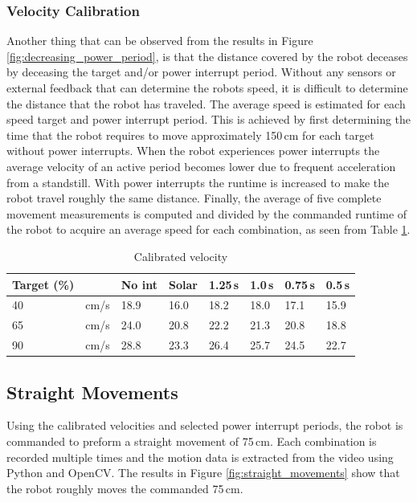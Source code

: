 \subsubsection{Velocity Calibration}
Another thing that can be observed from the results in Figure \ref{fig:decreasing_power_period}, is that the distance covered by the robot deceases by deceasing the target and/or power interrupt period.
Without any sensors or external feedback that can determine the robots speed, it is difficult to determine the distance that the robot has traveled.
The average speed is estimated for each speed target and power interrupt period.
This is achieved by first determining the time that the robot requires to move approximately 150\,cm for each target without power interrupts.
When the robot experiences power interrupts the average velocity of an active period becomes lower due to frequent acceleration from a standstill.
With power interrupts the runtime is increased to make the robot travel roughly the same distance.
Finally, the average of five complete movement measurements is computed and divided by the commanded runtime of the robot to acquire an average speed for each combination, as seen from Table \ref{tab:val_calib}.


\begin{table}[t]
	\centering
	\small
	\caption{Calibrated velocity}
	\label{tab:val_calib}
	\begin{tabular}{|l|l||l|l|l|l|l|l|}
		\hline
		Target (\%) & & No int & Solar & 1.25\,s & 1.0\,s & 0.75\,s & 0.5\,s \\
		\hline \hline
		 40 & cm/s & 18.9 & 16.0 & 18.2 & 18.0 & 17.1 & 15.9 \\
	     65 & cm/s & 24.0 & 20.8 & 22.2 & 21.3 & 20.8 & 18.8 \\
		 90 & cm/s & 28.8 & 23.3 & 26.4 & 25.7 & 24.5 & 22.7 \\
		\hline
	\end{tabular}
\end{table}

\subsection{Straight Movements}

Using the calibrated velocities and selected power interrupt periods, the robot is commanded to preform a straight movement of 75\,cm.
Each combination is recorded multiple times and the motion data is extracted from the video using Python and OpenCV.
The results in Figure \ref{fig:straight_movements} show that the robot roughly moves the commanded 75\,cm.

